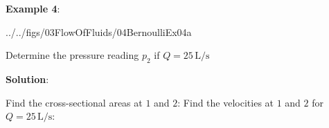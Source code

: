 \documentclass[10pt]{amsart}
\begin{document}
\begin{minipage}[t]{0.4\textwidth}
	\raggedright
	\textbf{Example 4}:\\
	\vspace*{-0.5cm}
	\begin{cfig}[0.42]{../../figs/03FlowOfFluids/04BernoulliEx04a}\end{cfig}
	Determine the pressure reading  $p_2$ if $Q=25\,\text{L/s}$
	
	\parb
	\textbf{Solution}:
	\parb
	
	Find the cross-sectional areas at $1$ and $2$:
	\parb
	Find the velocities at $1$ and $2$ for $Q=25\,\text{L/s}$:
\end{minipage}
\hfill
\end{document}
